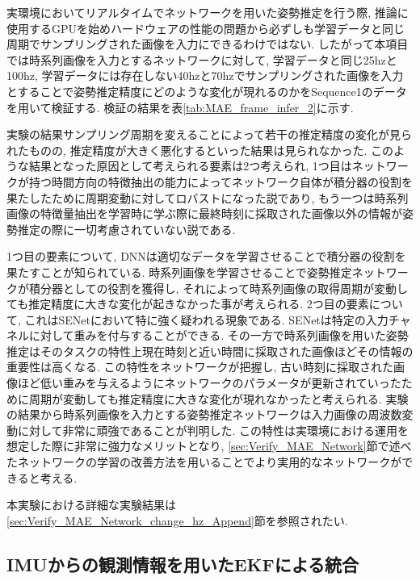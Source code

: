 実環境においてリアルタイムでネットワークを用いた姿勢推定を行う際, 推論に使用するGPUを始めハードウェアの性能の問題から必ずしも学習データと同じ周期でサンプリングされた画像を入力にできるわけではない. したがって本項目では時系列画像を入力とするネットワークに対して, 学習データと同じ25hzと100hz, 学習データには存在しない40hzと70hzでサンプリングされた画像を入力とすることで姿勢推定精度にどのような変化が現れるのかをSequence1のデータを用いて検証する. 検証の結果を表\ref{tab:MAE_frame_infer_2}に示す.\par
実験の結果サンプリング周期を変えることによって若干の推定精度の変化が見られたものの, 推定精度が大きく悪化するといった結果は見られなかった. このような結果となった原因として考えられる要素は2つ考えられ, 1つ目はネットワークが持つ時間方向の特徴抽出の能力によってネットワーク自体が積分器の役割を果たしたために周期変動に対してロバストになった説であり, もう一つは時系列画像の特徴量抽出を学習時に学ぶ際に最終時刻に採取された画像以外の情報が姿勢推定の際に一切考慮されていない説である.\par
1つ目の要素について, DNNは適切なデータを学習させることで積分器の役割を果たすことが知られている\cite{SI2022_IMU}. 時系列画像を学習させることで姿勢推定ネットワークが積分器としての役割を獲得し, それによって時系列画像の取得周期が変動しても推定精度に大きな変化が起きなかった事が考えられる. 2つ目の要素について, これはSENetにおいて特に強く疑われる現象である. SENetは特定の入力チャネルに対して重みを付与することができる. その一方で時系列画像を用いた姿勢推定はそのタスクの特性上現在時刻と近い時間に採取された画像ほどその情報の重要性は高くなる. この特性をネットワークが把握し, 古い時刻に採取された画像ほど低い重みを与えるようにネットワークのパラメータが更新されていったために周期が変動しても推定精度に大きな変化が現れなかったと考えられる. 実験の結果から時系列画像を入力とする姿勢推定ネットワークは入力画像の周波数変動に対して非常に頑強であることが判明した. この特性は実環境における運用を想定した際に非常に強力なメリットとなり, \ref{sec:Verify_MAE_Network}節で述べたネットワークの学習の改善方法を用いることでより実用的なネットワークができると考える. \par
本実験における詳細な実験結果は\ref{sec:Verify_MAE_Network_change_hz_Append}節を参照されたい.


\subsection{IMUからの観測情報を用いたEKFによる統合}\label{sec:Verify_EKF}


